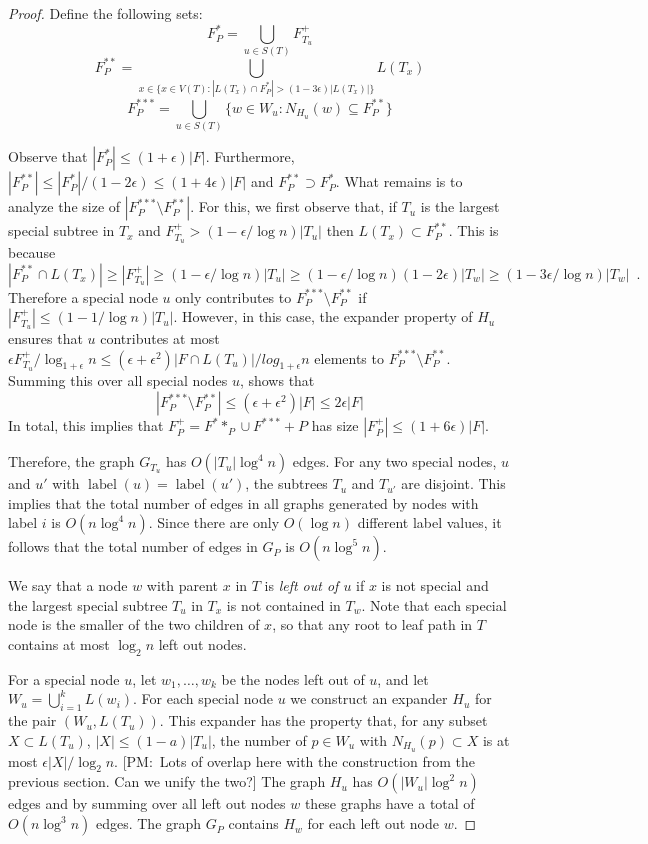 \documentclass{patmorin}
\newcommand{\note}[2]{{\color{red}[#1:~#2]}}
\DeclareMathOperator{\lbl}{label}
\begin{document}
\begin{proof}
  Define the following sets:
  \[  F^*_P = \bigcup_{u\in S(T)} F^+_{T_u} \]
  \[  F^{**}_P = \bigcup_{x\in \{x\in V(T): |L(T_x)\cap F^*_P| > (1-3\epsilon)|L(T_x)|\}} L(T_x) \]
  \[  F^{***}_P = \bigcup_{u\in S(T)} \{w \in W_u : N_{H_u}(w)\subseteq F^{**}_P \} \]

   Observe that $|F^*_P| \le (1+\epsilon)|F|$.  Furthermore, $|F^{**}_P|\le
   |F^*_P|/(1-2\epsilon) \le (1+4\epsilon)|F|$ and $F^{**}_P\supset F^*_P$.  What remains is to analyze the size of $|F^{***}_P\setminus F^{**}_P|$.  For this, we first observe that, if $T_u$ is the largest special subtree in $T_x$ and $F^+_{T_u} > (1-\epsilon/\log n)|T_u|$ then $L(T_x)\subset F^{**}_P$.  This is because
\[
   |F^{**}_P\cap L(T_x)| 
\ge  
   |F^+_{T_u}|
\ge  
   (1-\epsilon/\log n)|T_u|
\ge  
   (1-\epsilon/\log n)(1-2\epsilon)|T_w|
\ge  
   (1-3\epsilon/\log n)|T_w| \enspace .
\]
Therefore a special node $u$ only contributes to $F^{***}_P\setminus
F^{**}_P$ if $|F^+_{T_u}| \le (1-1/\log n)|T_u|$.  However, in this case,
the expander property of $H_u$ ensures that $u$ contributes at most
$\epsilon F^+_{T_u}/\log_{1+\epsilon} n\le (\epsilon+\epsilon^2)|F\cap L(T_u)|/log_{1+\epsilon} n$ elements to $F^{***}_P\setminus F^{**}_P$.
Summing this over all special nodes $u$, shows that
\[
   |F^{***}_P\setminus F^{**}_P| \le (\epsilon+\epsilon^2)|F| \le 2\epsilon|F|
\]
In total, this implies that $F^+_P = F^**_P\cup F^{***}+P$ has size $|F^+_P|\le (1+6\epsilon)|F|$.

Therefore, the graph $G_{T_u}$ has $O(|T_u|\log^4
  n)$ edges.  For any two special nodes, $u$ and $u'$ with $\lbl(u)=\lbl(u')$,
  the subtrees $T_u$ and $T_{u'}$ are disjoint.  This implies that the
  total number of edges in all graphs generated by nodes with label
  $i$ is $O(n\log^4 n)$.  Since there are only $O(\log n)$ different
  label values, it follows that the total number of edges in $G_P$
  is $O(n\log^5 n)$.

  We say that a node $w$ with parent $x$ in $T$ is \emph{left out of
  $u$} if $x$ is not special and the largest special subtree $T_u$
  in $T_x$ is not contained in $T_w$.  Note that each special node is
  the smaller of the two children of $x$, so that any root to leaf
  path in $T$ contains at most $\log_2 n$ left out nodes.  
	
  For a special node $u$, let $w_1,\ldots,w_k$ be the nodes left out of $u$, and  let $W_u=\bigcup_{i=1}^k L(w_i)$.  For each special node $u$ we construct
  an expander $H_u$ for the pair
  $(W_u,L(T_u))$. This expander has the property that, for any
  subset $X\subset L(T_u)$, $|X|\le (1-a)|T_u|$, the number of $p\in W_u$
  with $N_{H_u}(p)\subset X$ is at most $\epsilon|X|/\log_2 n$.
  \note{PM}{Lots of overlap here with the construction from the previous
  section. Can we unify the two?}  The graph $H_u$ has $O(|W_u|\log^2
  n)$ edges and by summing over all left out nodes $w$ these graphs have
  a total of $O(n\log^3 n)$ edges.  The graph $G_P$ contains $H_w$
  for each left out node $w$.


\end{proof}
\end{document}
